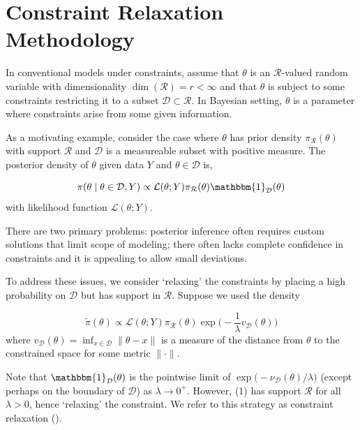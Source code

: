 \documentclass[10pt,fleqn]{article} \pdfoutput=1
\DeclareMathOperator{\1}{\mathbbm{1}} \DeclareMathOperator{\bigO}{\mc O}
\begin{document}
\section{Constraint Relaxation Methodology}

In conventional models under constraints, assume that $\theta$ is an
$\mathcal{R}$-valued random variable with dimensionality
$\dim(\mathcal{R})=r<\infty$ and that $\theta$ is subject to some
constraints restricting it to a subset $\mathcal{D} \subset \mathcal{R}$.
In Bayesian setting, $\theta$ is a parameter where constraints arise from
some given information.

As a motivating example, consider the case where $\theta$ has prior density
$\pi_\mathcal{R}(\theta)$ with support $\mathcal{R}$ and $\mathcal{D}$ is a
measureable subset with positive measure. The posterior density of $\theta$
given data $Y$ and $\theta \in \mathcal{D}$ is,


\begin{equation*}
	\pi(\theta \mid \theta \in \mathcal{D}, Y) \propto \mathcal{L}(\theta; Y)
	\pi_\mathcal{R}(\theta) \mathbbm{1}_\mathcal{D} (\theta)
\end{equation*}
with likelihood function $\mathcal{L}(\theta;Y)$.

There are two primary problems: posterior inference often requires custom
solutions that limit scope of modeling; there often lacks complete
confidence in constraints and it is appealing to allow small deviations.

To address these issues, we consider `relaxing' the constraints by placing
a high probability on $\mathcal{D}$ but has support in $\mathcal{R}$.
Suppose we used the density

\begin{equation}
	\label{EQ:Rel_Dens_Motivation}
	\tilde{\pi}(\theta) \propto
	\mathcal{L}(\theta; Y)  \pi_\mathcal{R}(\theta)
	\exp\bigg(-\frac{1}{\lambda} v_\mathcal{D}(\theta)\bigg)
\end{equation}
where $v_\mathcal{D}(\theta) = \inf_{x\in\mathcal{D}}
	\|\theta-x\|$ is a measure of the distance from $\theta$ to the constrained
space for some metric $\|\cdot\|$.

Note that $\mathbbm{1}_\mathcal{D}(\theta)$ is the pointwise limit of
$\exp\big(- \nu_\mathcal{D}(\theta)/\lambda)$ (except perhaps on the
boundary of $\mathcal{D}$) as $\lambda \to 0^+.$ However, (1) has
support $\mathcal{R}$ for all $\lambda > 0$, hence `relaxing' the
constraint. We refer to this strategy as constraint relaxation (\core).
\end{document}
